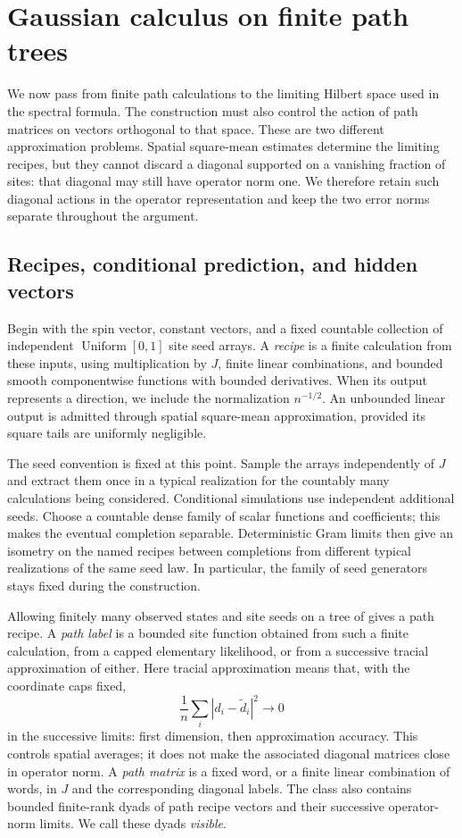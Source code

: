 \section{Gaussian calculus on finite path trees}
\label{sec:gaussian-calculus}

We now pass from finite path calculations to the limiting Hilbert
space used in the spectral formula.  The construction must also control
the action of path matrices on vectors orthogonal to that space.
These are two different approximation problems.  Spatial square-mean
estimates determine the limiting recipes, but they cannot discard a
diagonal supported on a vanishing fraction of sites: that diagonal
may still have operator norm one.  We therefore retain such diagonal
actions in the operator representation and keep the two error norms
separate throughout the argument.

\subsection{Recipes, conditional prediction, and hidden vectors}

Begin with the spin vector, constant vectors, and a fixed countable
collection of independent $\operatorname{Uniform}[0,1]$ site seed
arrays.  A \emph{recipe} is a finite calculation from these inputs,
using multiplication by $J$, finite linear combinations, and bounded
smooth componentwise functions with bounded derivatives.  When its
output represents a direction, we include the normalization
$n^{-1/2}$.  An unbounded linear output is admitted through spatial
square-mean approximation, provided its square tails are uniformly
negligible.

The seed convention is fixed at this point.  Sample the arrays
independently of $J$ and extract them once in a typical realization
for the countably many calculations being considered.  Conditional
simulations use independent additional seeds.  Choose a countable
dense family of scalar functions and coefficients; this makes the
eventual completion separable.  Deterministic Gram limits then give
an isometry on the named recipes between completions from different
typical realizations of the same seed law.  In particular, the family
of seed generators stays fixed during the construction.

Allowing finitely many observed states and site seeds on a tree of
 gives a path recipe.  A \emph{path label} is a
bounded site function obtained from such a finite calculation, from
a capped elementary likelihood, or from a successive tracial
approximation of either.  Here tracial approximation means that, with
the coordinate caps fixed,
\[
 \frac1n\sum_i|d_i-\widetilde d_i|^2\longrightarrow0
\]
in the successive limits: first dimension, then approximation
accuracy.  This controls spatial averages; it does not make the
associated diagonal matrices close in operator norm.  A
\emph{path matrix} is a fixed word, or a finite linear combination
of words, in $J$ and the corresponding diagonal labels.  The class
also contains bounded finite-rank dyads of path recipe vectors and
their successive operator-norm limits.  We call these dyads
\emph{visible}.

